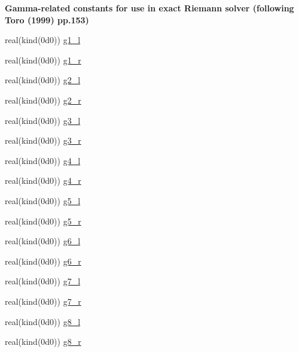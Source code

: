 \begin{Indent}\textbf{ Gamma-\/related constants for use in exact Riemann solver (following Toro (1999) pp.153)}\par
\begin{DoxyCompactItemize}
\item 
real(kind(0d0)) \hyperlink{namespacem__riemann__solvers_adbaf70dfc178970c3e210dddedc31971}{g1\+\_\+l}
\item 
real(kind(0d0)) \hyperlink{namespacem__riemann__solvers_a44476fe6f5a4cfd8e7bd9b7369a2bfd8}{g1\+\_\+r}
\item 
real(kind(0d0)) \hyperlink{namespacem__riemann__solvers_a80405eb6d8eaa75206edeef312c782d7}{g2\+\_\+l}
\item 
real(kind(0d0)) \hyperlink{namespacem__riemann__solvers_a29b168c298a62892312beaf804d88ebd}{g2\+\_\+r}
\item 
real(kind(0d0)) \hyperlink{namespacem__riemann__solvers_ac58b25fbd4733d5adff39c28b32673b8}{g3\+\_\+l}
\item 
real(kind(0d0)) \hyperlink{namespacem__riemann__solvers_a1e94f6d0053552684cebcc569b1a6f8a}{g3\+\_\+r}
\item 
real(kind(0d0)) \hyperlink{namespacem__riemann__solvers_ac44a4218c43a64bbe1b4d0dadc4726f1}{g4\+\_\+l}
\item 
real(kind(0d0)) \hyperlink{namespacem__riemann__solvers_adb408aa0458d5f80528aff6fa2d7eeb1}{g4\+\_\+r}
\item 
real(kind(0d0)) \hyperlink{namespacem__riemann__solvers_af4a82bacd4c2232f466428d41f34dffa}{g5\+\_\+l}
\item 
real(kind(0d0)) \hyperlink{namespacem__riemann__solvers_a8e9c08866eae6dd81d694a5685306973}{g5\+\_\+r}
\item 
real(kind(0d0)) \hyperlink{namespacem__riemann__solvers_aa0c3d3e0ab3821f201308018c8d3e550}{g6\+\_\+l}
\item 
real(kind(0d0)) \hyperlink{namespacem__riemann__solvers_aff8b1fce6e33a0d7e18fbf87c252f1cd}{g6\+\_\+r}
\item 
real(kind(0d0)) \hyperlink{namespacem__riemann__solvers_abbed27f1ec9cca777a83635a05fc8525}{g7\+\_\+l}
\item 
real(kind(0d0)) \hyperlink{namespacem__riemann__solvers_a746eb452c1a5c1db204624afaad5b478}{g7\+\_\+r}
\item 
real(kind(0d0)) \hyperlink{namespacem__riemann__solvers_a0f213519240daa52e669ecb053edae70}{g8\+\_\+l}
\item 
real(kind(0d0)) \hyperlink{namespacem__riemann__solvers_a6ece114ee17503f716a99a601c2ba5d1}{g8\+\_\+r}
\end{DoxyCompactItemize}
\end{Indent}
